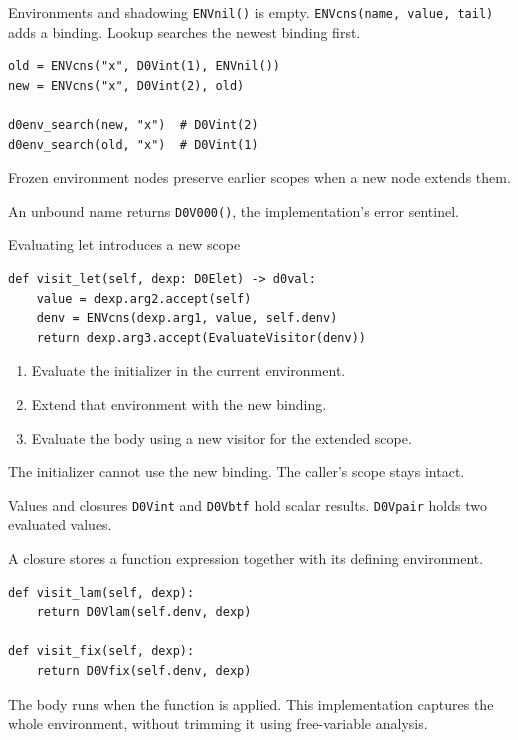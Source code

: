 \documentclass[aspectratio=169,11pt]{beamer}
\newcommand{\code}[1]{\texttt{#1}}
\begin{document}
\begin{frame}[fragile]{Environments and shadowing}
\code{ENVnil()} is empty. \code{ENVcns(name, value, tail)} adds a binding.
Lookup searches the newest binding first.
\begin{lstlisting}
old = ENVcns("x", D0Vint(1), ENVnil())
new = ENVcns("x", D0Vint(2), old)

d0env_search(new, "x")  # D0Vint(2)
d0env_search(old, "x")  # D0Vint(1)
\end{lstlisting}
Frozen environment nodes preserve earlier scopes when a new node extends them.
\medskip

An unbound name returns \code{D0V000()}, the implementation's error sentinel.
\end{frame}

\begin{frame}[fragile]{Evaluating let introduces a new scope}
\begin{lstlisting}
def visit_let(self, dexp: D0Elet) -> d0val:
    value = dexp.arg2.accept(self)
    denv = ENVcns(dexp.arg1, value, self.denv)
    return dexp.arg3.accept(EvaluateVisitor(denv))
\end{lstlisting}
\begin{enumerate}
\item Evaluate the initializer in the current environment.
\item Extend that environment with the new binding.
\item Evaluate the body using a new visitor for the extended scope.
\end{enumerate}
The initializer cannot use the new binding. The caller's scope stays intact.
\end{frame}

\begin{frame}[fragile]{Values and closures}
\code{D0Vint} and \code{D0Vbtf} hold scalar results.
\code{D0Vpair} holds two evaluated values.
\medskip

A \alert{closure} stores a function expression together with its defining environment.
\begin{lstlisting}
def visit_lam(self, dexp):
    return D0Vlam(self.denv, dexp)

def visit_fix(self, dexp):
    return D0Vfix(self.denv, dexp)
\end{lstlisting}
The body runs when the function is applied. This implementation captures the
whole environment, without trimming it using free-variable analysis.
\end{frame}
\end{document}
